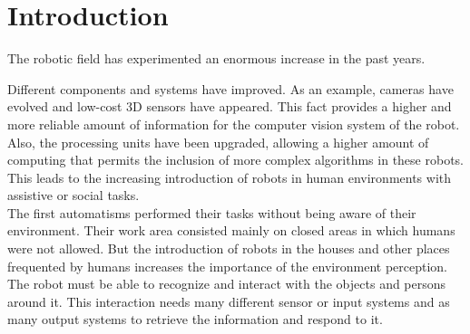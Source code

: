 \chapter{Introduction}
The robotic field has experimented an enormous increase in the past years. 

Different components and systems have improved.
As an example, cameras have evolved and low-cost 3D sensors have appeared. 
This fact provides a higher and more reliable amount of information for the computer vision system of the robot.  
Also, the processing units have been upgraded, allowing a higher amount of computing that permits the inclusion of more complex algorithms in these robots.  
This leads to the increasing introduction of robots in human environments with assistive or social tasks. 
\\


The first automatisms performed their tasks without being aware of their environment. 
Their work area consisted mainly on closed areas in which humans were not allowed. 
But the introduction of robots in the houses and other places frequented by humans increases the importance of the environment perception. 
The robot must be able to recognize and interact with the objects and persons around it. 
This interaction needs many different sensor or input systems and as many output systems to retrieve the information and respond to it.  
\\


